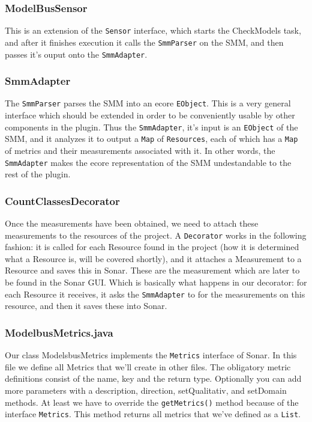 \subsubsection{ModelBusSensor}

This is an extension of the \texttt{Sensor} interface, which
starts the CheckModels task, and after it finishes execution
it calls the \texttt{SmmParser} on the SMM, and then passes
it's ouput onto the \texttt{SmmAdapter}.

\subsubsection{SmmAdapter}

The \texttt{SmmParser} parses the SMM into an ecore \texttt{EObject}.
This is a very general interface which should be extended in order
to be conveniently usable by other components in the plugin.
Thus the \texttt{SmmAdapter}, it's input is an \texttt{EObject}
of the SMM, and it analyzes it to output a \texttt{Map} of \texttt{Resources},
each of which has a \texttt{Map} of metrics and their measurements
associated with it. In other words, the \texttt{SmmAdapter} makes
the ecore representation of the SMM undestandable to the rest
of the plugin.

\subsubsection{CountClassesDecorator}

Once the measurements have been obtained, we need to attach these
measurements to the resources of the project. A \texttt{Decorator}
works in the following fashion: it is called for each Resource
found in the project (how it is determined what a Resource is, will
be covered shortly), and it attaches a Measurement to a Resource
and saves this in Sonar. These are the measurement which are later
to be found in the Sonar GUI. Which is basically what happens in
our decorator: for each Resource it receives, it asks the \texttt{SmmAdapter}
to for the measurements on this resource, and then it saves these
into Sonar.

\subsubsection{ModelbusMetrics.java}

Our class ModelsbusMetrics implements the \texttt{Metrics} interface of
Sonar. In this file we define all Metrics that we'll create in other
files. The obligatory metric definitions consist of the name, key and
the return type. Optionally you can add more parameters with a
description, direction, setQualitativ, and setDomain methods. At least
we have to override the \texttt{getMetrics()} method because of the interface
\texttt{Metrics}. This method returns all metrics that we've defined
as a \texttt{List}.

